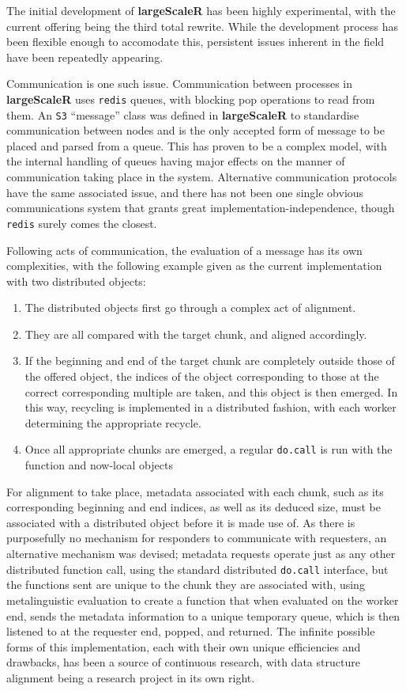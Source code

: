 The initial development of \textbf{largeScaleR} has been highly experimental, with the current offering being the third total rewrite.
While the development process has been flexible enough to accomodate this, persistent issues inherent in the field have been repeatedly appearing.

Communication is one such issue.
Communication between processes in \textbf{largeScaleR} uses \texttt{redis} queues, with blocking pop operations to read from them.
An \texttt{S3} ``message'' class was defined in \textbf{largeScaleR} to standardise communication between nodes and is the only accepted form of message to be placed and parsed from a queue.
This has proven to be a complex model, with the internal handling of queues having major effects on the manner of communication taking place in the system.
Alternative communication protocols have the same associated issue, and there has not been one single obvious communications system that grants great implementation-independence, though \texttt{redis} surely comes the closest\cite{da2015redis}.

Following acts of communication, the evaluation of a message has its own complexities, with the following example given as the current implementation with two distributed objects:
\begin{enumerate}
	\item The distributed objects first go through a complex act of alignment.
	\item They are all compared with the target chunk, and aligned accordingly.
	\item If the beginning and end of the target chunk are completely outside those of the offered object, the indices of the object corresponding to those at the correct corresponding multiple are taken, and this object is then emerged.
		In this way, recycling is implemented in a distributed fashion, with each worker determining the appropriate recycle.
	\item Once all appropriate chunks are emerged, a regular \texttt{do.call} is run with the function and now-local objects
\end{enumerate}
For alignment to take place, metadata associated with each chunk, such as its corresponding beginning and end indices, as well as its deduced size, must be associated with a distributed object before it is made use of.
As there is purposefully no mechanism for responders to communicate with requesters, an alternative mechanism was devised; metadata requests operate just as any other distributed function call, using the standard distributed \texttt{do.call} interface, but the functions sent are unique to the chunk they are associated with, using metalinguistic evaluation to create a function that when evaluated on the worker end, sends the metadata information to a unique temporary queue, which is then listened to at the requester end, popped, and returned.
The infinite possible forms of this implementation, each with their own unique efficiencies and drawbacks, has been a source of continuous research, with data structure alignment being a research project in its own right\cite{bryant2015computer}\cite{li1991data}.

